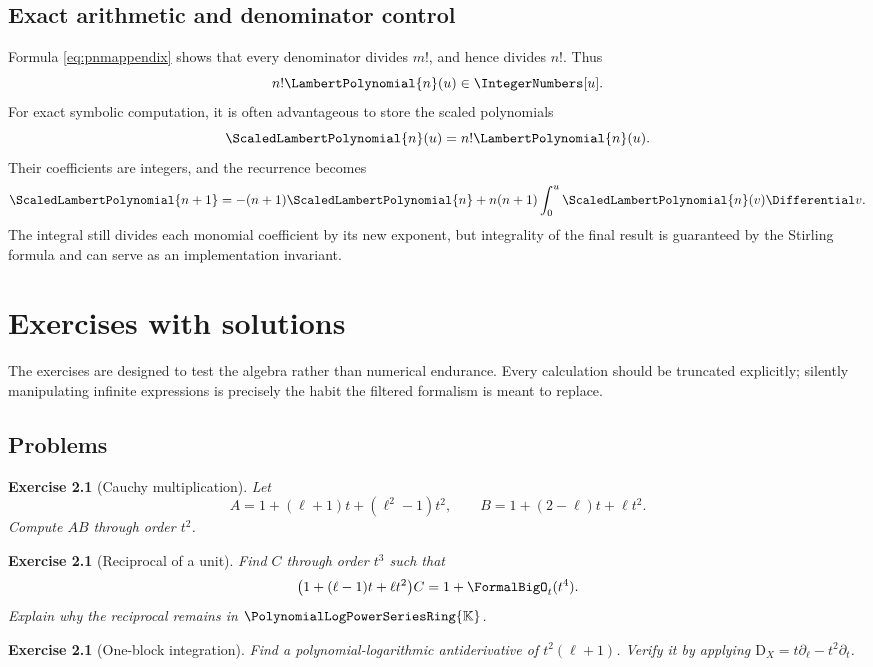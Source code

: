 \documentclass[11pt,oneside,openany]{book}
\newtheorem{exercise}[theorem]{Exercise}
\newcommand{\K}{\mathbb{K}}
\newcommand{\Rring}{\PolynomialLogPowerSeriesRing{\K}}
\newcommand{\D}{\mathrm{D}}
\begin{document}
\section{Exact arithmetic and denominator control}
Formula \cref{eq:pnmappendix} shows that every denominator divides \(m!\),
and hence divides \(n!\).  Thus
\[
 n!\LambertPolynomial{n}(u)\in\IntegerNumbers[u].
\]
For exact symbolic computation, it is often advantageous to store the scaled
polynomials
\[
 \ScaledLambertPolynomial{n}(u)=n!\LambertPolynomial{n}(u).
\]
Their coefficients are integers, and the recurrence becomes
\begin{equation}\label{eq:scaledPrec}
 \ScaledLambertPolynomial{n+1}
 =-(n+1)\ScaledLambertPolynomial{n}
   +n(n+1)\int_0^u\ScaledLambertPolynomial{n}(v)\Differential v.
\end{equation}
The integral still divides each monomial coefficient by its new exponent, but
integrality of the final result is guaranteed by the Stirling formula and can
serve as an implementation invariant.


\chapter{Exercises with solutions}
\label{app:exercises}

The exercises are designed to test the algebra rather than numerical
endurance.  Every calculation should be truncated explicitly; silently
manipulating infinite expressions is precisely the habit the filtered formalism
is meant to replace.

\section{Problems}

\begin{exercise}[Cauchy multiplication]
Let
\[
 A=1+(\ell+1)t+(\ell^2-1)t^2,
 \qquad
 B=1+(2-\ell)t+\ell t^2.
\]
Compute \(AB\) through order \(t^2\).
\end{exercise}

\begin{exercise}[Reciprocal of a unit]
Find \(C\) through order \(t^3\) such that
\[
 \bigl(1+(\ell-1)t+\ell t^2\bigr)C=1+\FormalBigO_t(t^4).
\]
Explain why the reciprocal remains in \(\Rring\).
\end{exercise}

\begin{exercise}[One-block integration]
Find a polynomial-logarithmic antiderivative of
\(t^2(\ell+1)\).  Verify it by applying
\(\D_X=t\partial_\ell-t^2\partial_t\).
\end{exercise}
\end{document}
